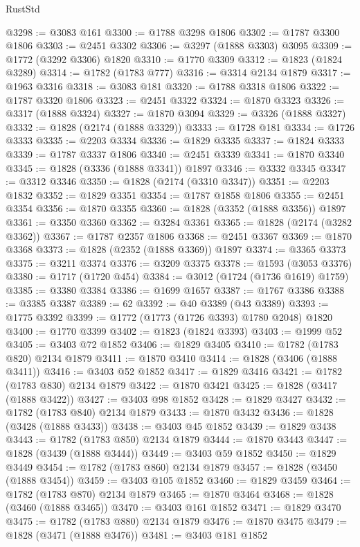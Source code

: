 \begin{lexlean}{RustStd}
\begin{coremodule}
@3298 := @3083 @161
@3300 := @1788 @3298 @1806
@3302 := @1787 @3300 @1806
@3303 := @2451 @3302
@3306 := @3297 (@1888 @3303) @3095
@3309 := @1772 (@3292 @3306) @1820
@3310 := @1770 @3309
@3312 := @1823 (@1824 @3289)
@3314 := @1782 (@1783 @777)
@3316 := @3314 @2134 @1879
@3317 := @1963 @3316
@3318 := @3083 @181
@3320 := @1788 @3318 @1806
@3322 := @1787 @3320 @1806
@3323 := @2451 @3322
@3324 := @1870 @3323
@3326 := @3317 (@1888 @3324)
@3327 := @1870 @3094
@3329 := @3326 (@1888 @3327)
@3332 := @1828 (@2174 (@1888 @3329))
@3333 := @1728 @181
@3334 := @1726 @3333
@3335 := @2203 @3334
@3336 := @1829 @3335
@3337 := @1824 @3333
@3339 := @1787 @3337 @1806
@3340 := @2451 @3339
@3341 := @1870 @3340
@3345 := @1828 (@3336 (@1888 @3341)) @1897
@3346 := @3332 @3345
@3347 := @3312 @3346
@3350 := @1828 (@2174 (@3310 @3347))
@3351 := @2203 @1832
@3352 := @1829 @3351
@3354 := @1787 @1858 @1806
@3355 := @2451 @3354
@3356 := @1870 @3355
@3360 := @1828 (@3352 (@1888 @3356)) @1897
@3361 := @3350 @3360
@3362 := @3284 @3361
@3365 := @1828 (@2174 (@3282 @3362))
@3367 := @1787 @2357 @1806
@3368 := @2451 @3367
@3369 := @1870 @3368
@3373 := @1828 (@2352 (@1888 @3369)) @1897
@3374 := @3365 @3373
@3375 := @3211 @3374
@3376 := @3209 @3375
@3378 := @1593 (@3053 @3376)
@3380 := @1717 (@1720 @454)
@3384 := @3012 (@1724 (@1736 @1619) @1759)
@3385 := @3380 @3384
@3386 := @1699 @1657
@3387 := @1767 @3386
@3388 := @3385 @3387
@3389 := 62
@3392 := @40 @3389 (@43 @3389)
@3393 := @1775 @3392
@3399 := @1772 (@1773 (@1726 @3393) @1780 @2048) @1820
@3400 := @1770 @3399
@3402 := @1823 (@1824 @3393)
@3403 := @1999 @52
@3405 := @3403 @72 @1852
@3406 := @1829 @3405
@3410 := @1782 (@1783 @820) @2134 @1879
@3411 := @1870 @3410
@3414 := @1828 (@3406 (@1888 @3411))
@3416 := @3403 @52 @1852
@3417 := @1829 @3416
@3421 := @1782 (@1783 @830) @2134 @1879
@3422 := @1870 @3421
@3425 := @1828 (@3417 (@1888 @3422))
@3427 := @3403 @98 @1852
@3428 := @1829 @3427
@3432 := @1782 (@1783 @840) @2134 @1879
@3433 := @1870 @3432
@3436 := @1828 (@3428 (@1888 @3433))
@3438 := @3403 @45 @1852
@3439 := @1829 @3438
@3443 := @1782 (@1783 @850) @2134 @1879
@3444 := @1870 @3443
@3447 := @1828 (@3439 (@1888 @3444))
@3449 := @3403 @59 @1852
@3450 := @1829 @3449
@3454 := @1782 (@1783 @860) @2134 @1879
@3457 := @1828 (@3450 (@1888 @3454))
@3459 := @3403 @105 @1852
@3460 := @1829 @3459
@3464 := @1782 (@1783 @870) @2134 @1879
@3465 := @1870 @3464
@3468 := @1828 (@3460 (@1888 @3465))
@3470 := @3403 @161 @1852
@3471 := @1829 @3470
@3475 := @1782 (@1783 @880) @2134 @1879
@3476 := @1870 @3475
@3479 := @1828 (@3471 (@1888 @3476))
@3481 := @3403 @181 @1852

\end{coremodule}
\end{lexlean}
